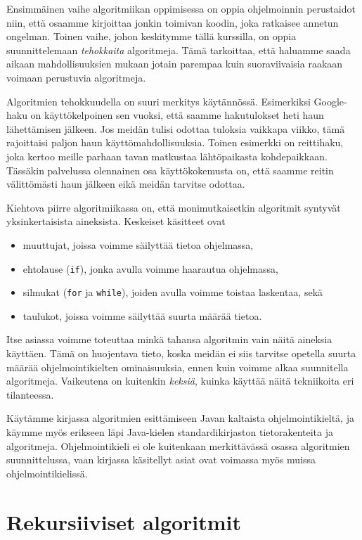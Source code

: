 Ensimmäinen vaihe algoritmiikan oppimisessa on oppia
ohjelmoinnin perustaidot niin, että osaamme kirjoittaa
jonkin toimivan koodin, joka ratkaisee annetun ongelman.
Toinen vaihe, johon keskitymme tällä kurssilla,
on oppia suunnittelemaan \emph{tehokkaita} algoritmeja.
Tämä tarkoittaa, että haluamme saada aikaan mahdollisuuksien mukaan
jotain parempaa kuin suoraviivaisia
raakaan voimaan perustuvia algoritmeja.

Algoritmien tehokkuudella on suuri merkitys käytännössä.
Esimerkiksi Google-haku on käyttökelpoinen sen vuoksi,
että saamme hakutulokset heti haun lähettämisen jälkeen.
Jos meidän tulisi odottaa tuloksia vaikkapa viikko,
tämä rajoittaisi paljon haun käyttömahdollisuuksia.
Toinen esimerkki on reittihaku, joka kertoo meille parhaan
tavan matkustaa lähtöpaikasta kohdepaikkaan.
Tässäkin palvelussa olennainen osa käyttökokemusta on,
että saamme reitin välittömästi haun jälkeen eikä meidän tarvitse odottaa.

Kiehtova piirre algoritmiikassa on, että monimutkaisetkin algoritmit
syntyvät yksinkertaisista aineksista. Keskeiset käsitteet ovat

\begin{itemize}
\item muuttujat, joissa voimme säilyttää tietoa ohjelmassa,
\item ehtolause (\texttt{if}), jonka avulla voimme haarautua ohjelmassa,
\item silmukat (\texttt{for} ja \texttt{while}), joiden avulla voimme
toistaa laskentaa, sekä
\item taulukot, joissa voimme säilyttää suurta määrää tietoa.
\end{itemize}

Itse asiassa voimme toteuttaa minkä tahansa algoritmin vain näitä
aineksia käyttäen.
Tämä on huojentava tieto, koska meidän ei siis tarvitse opetella
suurta määrää ohjelmointikielten ominaisuuksia,
ennen kuin voimme alkaa suunnitella algoritmeja.
Vaikeutena on kuitenkin \emph{keksiä}, kuinka käyttää näitä
tekniikoita eri tilanteessa.

Käytämme kirjassa algoritmien esittämiseen Javan kaltaista
ohjelmointikieltä, ja käymme myös erikseen läpi Java-kielen
standardikirjaston tietorakenteita ja algoritmeja.
Ohjelmointikieli ei ole kuitenkaan merkittävässä osassa
algoritmien suunnittelussa, vaan kirjassa käsitellyt asiat
ovat voimassa myös muissa ohjelmointikielissä.

\section{Rekursiiviset algoritmit}

